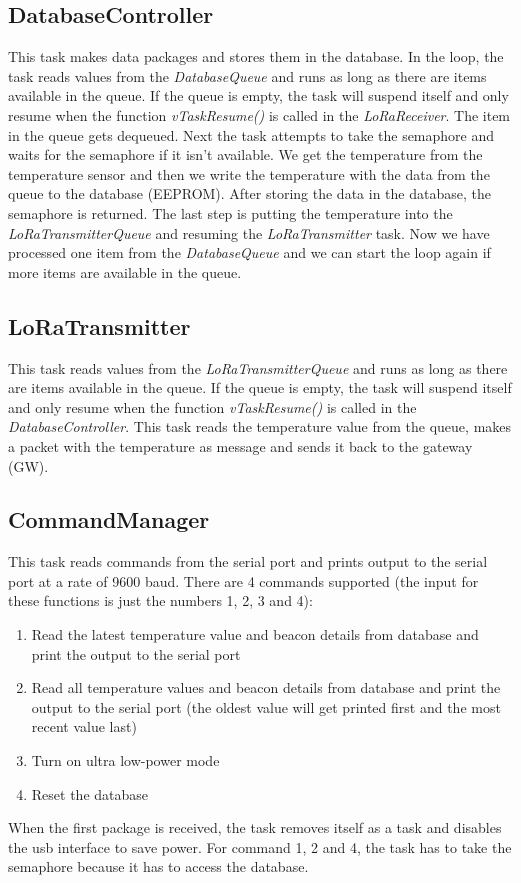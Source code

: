 \documentclass{scrartcl}
\begin{document}
\subsection{DatabaseController}
This task makes data packages and stores them in the database.
In the loop, the task reads values from the \textit{DatabaseQueue} and runs as long as there are items available in the queue.
If the queue is empty, the task will suspend itself and only resume when the function \textit{vTaskResume()} is called in the \textit{LoRaReceiver}.
The item in the queue gets dequeued. Next the task attempts to take the semaphore and waits for the semaphore if it isn't available.
We get the temperature from the temperature sensor and then we write the temperature with the data from the queue to the database (EEPROM).
After storing the data in the database, the semaphore is returned.
The last step is putting the temperature into the \textit{LoRaTransmitterQueue} and resuming the \textit{LoRaTransmitter} task.
Now we have processed one item from the \textit{DatabaseQueue} and we can start the loop again if more items are available in the queue.

\newpage

\subsection{LoRaTransmitter}
This task reads values from the \textit{LoRaTransmitterQueue} and runs as long as there are items available in the queue.
If the queue is empty, the task will suspend itself and only resume when the function \textit{vTaskResume()} is called in the \textit{DatabaseController}.
This task reads the temperature value from the queue, makes a packet with the temperature as message and sends it back to the gateway (GW).

\subsection{CommandManager}
This task reads commands from the serial port and prints output to the serial port at a rate of 9600 baud.
There are 4 commands supported (the input for these functions is just the numbers 1, 2, 3 and 4):
\begin{enumerate}
    \item Read the latest temperature value and beacon details from database and print the output to the serial port
    \item Read all temperature values and beacon details from database and print the output to the serial port
        (the oldest value will get printed first and the most recent value last)
    \item Turn on ultra low-power mode
    \item Reset the database
\end{enumerate}
When the first package is received, the task removes itself as a task and disables the usb interface to save power.
For command 1, 2 and 4, the task has to take the semaphore because it has to access the database.
\end{document}
